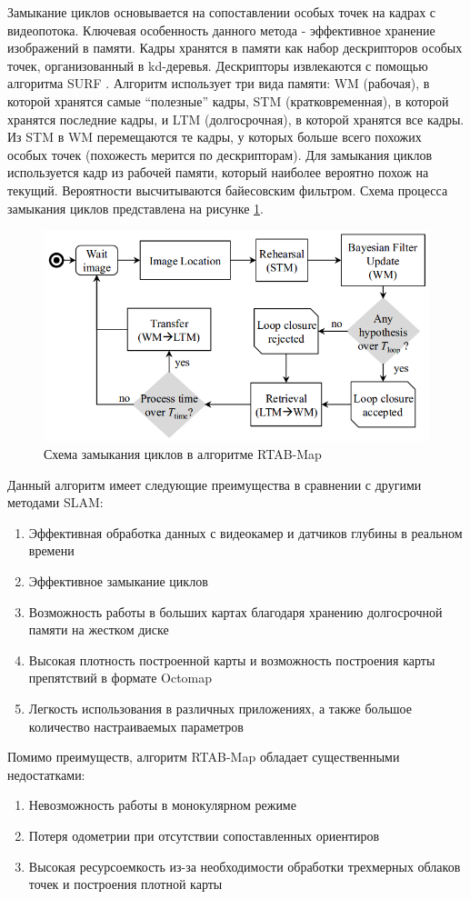 \documentclass{mipt-thesis-ms}
\begin{document}
	Замыкание циклов основывается на сопоставлении особых точек на кадрах с видеопотока. Ключевая особенность данного метода - эффективное хранение изображений в памяти. Кадры хранятся в памяти как набор дескрипторов особых точек, организованный в kd-деревья. Дескрипторы извлекаются с помощью алгоритма SURF \cite{bay2006surf}. Алгоритм использует три вида памяти: WM (рабочая), в которой хранятся самые “полезные” кадры, STM (кратковременная), в которой хранятся последние кадры, и LTM (долгосрочная), в которой хранятся все кадры. Из STM в WM перемещаются те кадры, у которых больше всего похожих особых точек (похожесть мерится по дескрипторам). Для замыкания циклов используется кадр из рабочей памяти, который наиболее вероятно похож на текущий. Вероятности высчитываются байесовским фильтром. Схема процесса замыкания циклов представлена на рисунке \ref{figureloopclosing}.
	
	\begin{figure}
		\centering
		\includegraphics[scale=0.5]{img/rtabmap_loopclosure.png}
		\caption{Схема замыкания циклов в алгоритме RTAB-Map}
		\label{figureloopclosing}
	\end{figure}
	
	Данный алгоритм имеет следующие преимущества в сравнении с другими методами SLAM:
	\begin{enumerate}
		\item {Эффективная обработка данных с видеокамер и датчиков глубины в реальном времени}
		\item {Эффективное замыкание циклов}
		\item {Возможность работы в больших картах благодаря хранению долгосрочной памяти на жестком диске}
		\item {Высокая плотность построенной карты и возможность построения карты препятствий в формате Octomap}
		\item {Легкость использования в различных приложениях, а также большое количество настраиваемых параметров}
	\end{enumerate}
	Помимо преимуществ, алгоритм RTAB-Map обладает существенными недостатками:
	\begin{enumerate}
		\item {Невозможность работы в монокулярном режиме}
		\item {Потеря одометрии при отсутствии сопоставленных ориентиров}
		\item {Высокая ресурсоемкость из-за необходимости обработки трехмерных облаков точек и построения плотной карты}
	\end{enumerate}
	
\end{document}
